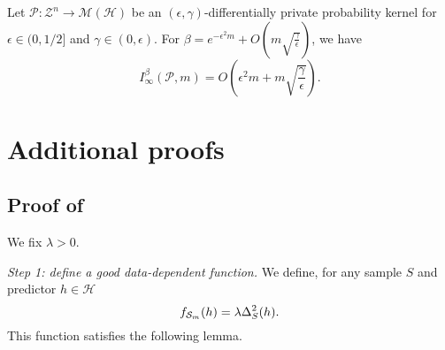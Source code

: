 \begin{noaddcontents}
\begin{proposition}
\label{prop: rogers}
Let $\mathcal{P}: \mathcal{Z}^n \rightarrow \mathcal{M}(\mathcal{H})$ be an $(\epsilon, \gamma)$-differentially private probability kernel for $\epsilon \in(0,1 / 2]$ and $\gamma \in(0, \epsilon)$.
For $\beta=e^{-\epsilon^2 m}+O\left(m \sqrt{\frac{\gamma}{\epsilon}}\right)$, we have
$$
I_{\infty}^\beta(\mathcal{P}, m)=O\left(\epsilon^2 m + m \sqrt{\frac{\gamma}{\epsilon}}\right) .
$$
\end{proposition}



 
\section{Additional proofs}
\label{sec: proofs_chap_5}
\subsection{Proof of }
\label{sec: proof_compact_mcall}
We fix $\lambda>0$.

\textit{Step 1: define a good data-dependent function.} We define, for any sample $S$ and predictor $h\in \mathcal{H}$
\[ f_{\mathcal{S}_m}(h) = \lambda \Delta_S^2(h). \]
This function satisfies the following lemma.


\end{noaddcontents}
